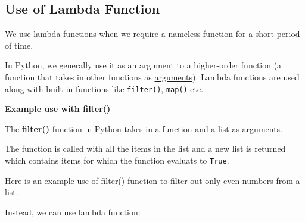 \documentclass[11pt]{article}
\newenvironment{Shaded}{}{}
\newcommand{\KeywordTok}[1]{\textcolor[rgb]{0.00,0.44,0.13}{\textbf{{#1}}}}
\newcommand{\DecValTok}[1]{\textcolor[rgb]{0.25,0.63,0.44}{{#1}}}
\newcommand{\NormalTok}[1]{{#1}}
\newcommand{\ControlFlowTok}[1]{\textcolor[rgb]{0.00,0.44,0.13}{\textbf{{#1}}}}
\newcommand{\OperatorTok}[1]{\textcolor[rgb]{0.40,0.40,0.40}{{#1}}}
\newcommand{\BuiltInTok}[1]{{#1}}
\begin{document}
    \subsection{Use of Lambda Function}\label{use-of-lambda-function}

We use lambda functions when we require a nameless function for a short
period of time.

In Python, we generally use it as an argument to a higher-order function
(a function that takes in other functions as
\href{https://www.programiz.com/python-programming/function-argument}{arguments}).
Lambda functions are used along with built-in functions like
\texttt{filter()}, \texttt{map()} etc.

\textbf{Example use with filter()}

The \textbf{filter()} function in Python takes in a function and a list
as arguments.

The function is called with all the items in the list and a new list is
returned which contains items for which the function evaluats to
\texttt{True}.

Here is an example use of filter() function to filter out only even
numbers from a list.

\begin{Shaded}
\end{Shaded}

Instead, we can use lambda function:

\begin{Shaded}
\end{Shaded}
\end{document}
